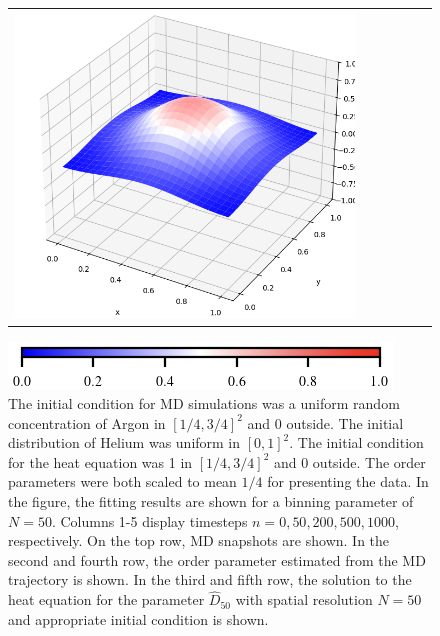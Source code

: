 \documentclass[12pt, reqno]{report}
\theoremstyle{definition}
\theoremstyle{remark}
\begin{document}
\begin{figure}[H]
\begin{tabular}{rccccc}
        \includegraphics[align = c, height=\subheight]{media_paper/surf_FD_n=1000.png}
    \end{tabular}

    \hspace{40pt}\includegraphics[width = .55\paperwidth]{media_paper/diff_colorbar.png}

    \caption{ %
        The initial condition for MD simulations was a uniform random concentration of Argon in $[1/4,3/4]^2$ and 0 outside. 
        The initial distribution of Helium was uniform in $[0,1]^2$.
        The initial condition for the heat equation was 1 in $[1/4,3/4]^2$ and 0 outside.
        The order parameters were both scaled to mean $1/4$ for presenting the data.
        In the figure, the fitting results are shown for a binning parameter of $N=50$. 
        Columns 1-5 display timesteps $n=0,50,200,500,1000$, respectively.
        On the top row, MD snapshots are shown.
        In the second and fourth row, the order parameter estimated from the MD trajectory is shown.
        In the third and fifth row, the solution to the heat equation for the parameter $\hat D_{50}$ with spatial resolution $N=50$ and appropriate initial condition is shown.
    }
    \label{fg_diff_results}
\end{figure}
\end{document}
